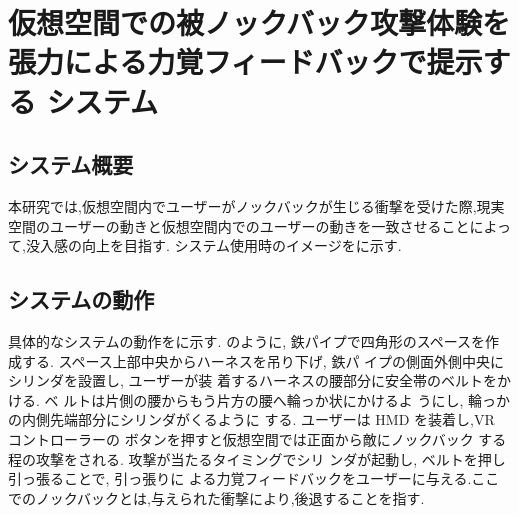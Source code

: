 \chapter{仮想空間での被ノックバック攻撃体験を張力による力覚フィードバックで提示する
システム}

\section{システム概要}
本研究では,仮想空間内でユーザーがノックバックが生じる衝撃を受けた際,現実空間のユーザーの動きと仮想空間内でのユーザーの動きを一致させることによって,没入感の向上を目指す.
システム使用時のイメージをに示す.

\section{システムの動作}
具体的なシステムの動作をに示す.
のように, 鉄パイプで四角形のスペースを作
成する. スペース上部中央からハーネスを吊り下げ, 鉄パ
イプの側面外側中央にシリンダを設置し, ユーザーが装
着するハーネスの腰部分に安全帯のベルトをかける. ベ
ルトは片側の腰からもう片方の腰へ輪っか状にかけるよ
うにし, 輪っかの内側先端部分にシリンダがくるように
する. ユーザーは HMD を装着し,VR コントローラーの
ボタンを押すと仮想空間では正面から敵にノックバック
する程の攻撃をされる. 攻撃が当たるタイミングでシリ
ンダが起動し, ベルトを押し引っ張ることで, 引っ張りに
よる力覚フィードバックをユーザーに与える.ここでのノックバックとは,与えられた衝撃により,後退することを指す. 



